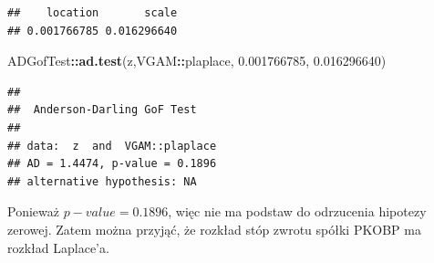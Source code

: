 \documentclass[polish,]{book}
\newenvironment{Shaded}{\begin{snugshade}}{\end{snugshade}}
\newcommand{\FloatTok}[1]{\textcolor[rgb]{0.00,0.00,0.81}{#1}}
\newcommand{\KeywordTok}[1]{\textcolor[rgb]{0.13,0.29,0.53}{\textbf{#1}}}
\newcommand{\NormalTok}[1]{#1}
\newcommand{\OperatorTok}[1]{\textcolor[rgb]{0.81,0.36,0.00}{\textbf{#1}}}
\begin{document}
\begin{verbatim}
##    location       scale 
## 0.001766785 0.016296640
\end{verbatim}

\begin{Shaded}
\begin{Highlighting}[]
\NormalTok{ADGofTest}\OperatorTok{::}\KeywordTok{ad.test}\NormalTok{(z,VGAM}\OperatorTok{::}\NormalTok{plaplace, }\FloatTok{0.001766785}\NormalTok{, }\FloatTok{0.016296640}\NormalTok{)}
\end{Highlighting}
\end{Shaded}

\begin{verbatim}
## 
##  Anderson-Darling GoF Test
## 
## data:  z  and  VGAM::plaplace
## AD = 1.4474, p-value = 0.1896
## alternative hypothesis: NA
\end{verbatim}

Ponieważ \(p-value = 0.1896\), więc nie ma podstaw do odrzucenia hipotezy zerowej.
Zatem można przyjąć, że rozkład stóp zwrotu spółki PKOBP ma rozkład Laplace'a.
\end{document}
